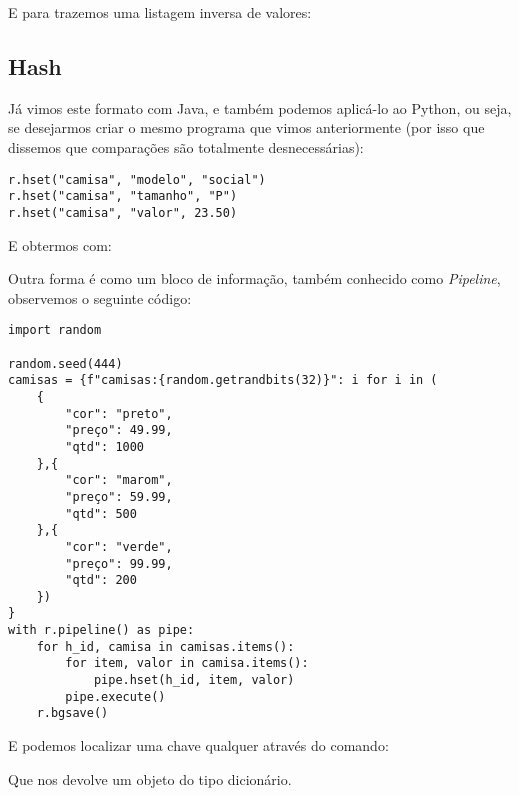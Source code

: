 E para trazemos uma listagem inversa de valores: \\

\subsection{Hash}
Já vimos este formato com Java, e também podemos aplicá-lo ao Python, ou seja, se desejarmos criar o mesmo programa que vimos anteriormente (por isso que dissemos que comparações são totalmente desnecessárias):
\begin{lstlisting}[]
r.hset("camisa", "modelo", "social")
r.hset("camisa", "tamanho", "P")
r.hset("camisa", "valor", 23.50)
\end{lstlisting}

E obtermos com: \\

Outra forma é como um bloco de informação, também conhecido como \textit{Pipeline}, observemos o seguinte código:
\begin{lstlisting}[]
import random

random.seed(444)
camisas = {f"camisas:{random.getrandbits(32)}": i for i in (
	{
		"cor": "preto",
		"preço": 49.99,
		"qtd": 1000
	},{
		"cor": "marom",
		"preço": 59.99,
		"qtd": 500
	},{
		"cor": "verde",
		"preço": 99.99,
		"qtd": 200
	})
}
with r.pipeline() as pipe:
	for h_id, camisa in camisas.items():
		for item, valor in camisa.items():
			pipe.hset(h_id, item, valor)
		pipe.execute()
	r.bgsave()
\end{lstlisting}

E podemos localizar uma chave qualquer através do comando: \\

Que nos devolve um objeto do tipo dicionário.